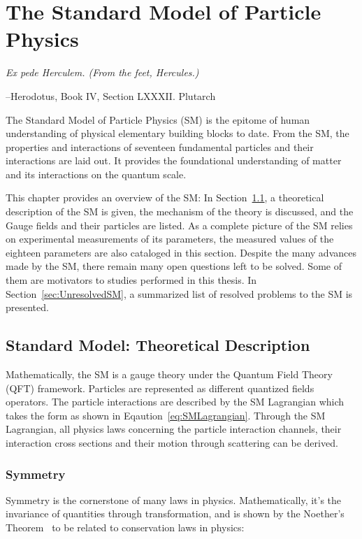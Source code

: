 \chapter{The Standard Model of Particle Physics}
\label{chapter:SM}


\epigraph{\textit{Ex pede Herculem. \newline(From the feet, Hercules.)}}{--Herodotus, Book IV, Section LXXXII. Plutarch}


The Standard Model of Particle Physics (SM) is the epitome of human understanding of physical elementary building blocks to date. From the SM, the properties and interactions of seventeen fundamental particles and their interactions are laid out. It provides the foundational understanding of matter and its interactions on the quantum scale.

This chapter provides an overview of the SM: In Section~\ref{sec:SM}, a theoretical description of the SM is given, the mechanism of the theory is discussed, and the Gauge fields and their particles are listed. As a complete picture of the SM relies on experimental measurements of its parameters, the measured values of the eighteen parameters are also cataloged in this section. Despite the many advances made by the SM, there remain many open
questions left to be solved. Some of them are motivators to studies performed in this thesis. In Section~\ref{sec:UnresolvedSM}, a summarized list of resolved problems to the SM is presented.

\section{Standard Model: Theoretical Description}
\label{sec:SM}

Mathematically, the SM is a gauge theory under the 
Quantum Field Theory (QFT) framework. Particles are represented as different quantized fields operators. The particle interactions are described by the SM Lagrangian which takes the form as shown in Eqaution~\ref{eq:SMLagrangian}. Through the SM Lagrangian, all physics laws concerning the particle interaction channels, their interaction cross sections and their motion through scattering can be derived.

\subsection{Symmetry}
Symmetry is the cornerstone of many laws in physics. Mathematically, it's the invariance of quantities through transformation, and is shown by the Noether's Theorem~\cite{sarlet1981generalizations} to be related to conservation laws in physics:

